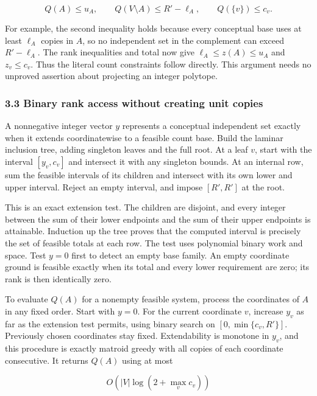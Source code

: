\[
Q(A)\le u_A,
\qquad Q(V\setminus A)\le R'-\ell_A,
\qquad Q(\{v\})\le c_v.
\tag{DW9}
\]

For example, the second inequality holds because every conceptual base uses at least \(\ell_A\) copies in \(A\), so no independent set in the complement can exceed \(R'-\ell_A\). The rank inequalities and total now give \(\ell_A\le z(A)\le u_A\) and \(z_v\le c_v\). Thus the literal count constraints follow directly. This argument needs no unproved assertion about projecting an integer polytope.

\hypertarget{af-fe230a140d-binary-rank-access-without-creating-unit-copies}{%
\subsubsection{3.3 Binary rank access without creating unit copies}\label{af-fe230a140d-binary-rank-access-without-creating-unit-copies}}

A nonnegative integer vector \(y\) represents a conceptual independent set exactly when it extends coordinatewise to a feasible count base. Build the laminar inclusion tree, adding singleton leaves and the full root. At a leaf \(v\), start with the interval \([y_v,c_v]\) and intersect it with any singleton bounds. At an internal row, sum the feasible intervals of its children and intersect with its own lower and upper interval. Reject an empty interval, and impose \([R',R']\) at the root.

This is an exact extension test. The children are disjoint, and every integer between the sum of their lower endpoints and the sum of their upper endpoints is attainable. Induction up the tree proves that the computed interval is precisely the set of feasible totals at each row. The test uses polynomial binary work and space. Test \(y=0\) first to detect an empty base family. An empty coordinate ground is feasible exactly when its total and every lower requirement are zero; its rank is then identically zero.

To evaluate \(Q(A)\) for a nonempty feasible system, process the coordinates of \(A\) in any fixed order. Start with \(y=0\). For the current coordinate \(v\), increase \(y_v\) as far as the extension test permits, using binary search on \([0,\min\{c_v,R'\}]\). Previously chosen coordinates stay fixed. Extendability is monotone in \(y_v\), and this procedure is exactly matroid greedy with all copies of each coordinate consecutive. It returns \(Q(A)\) using at most

\[
O\!\left(|V|\log(2+\max_v c_v)\right)
\tag{DW10}
\]

